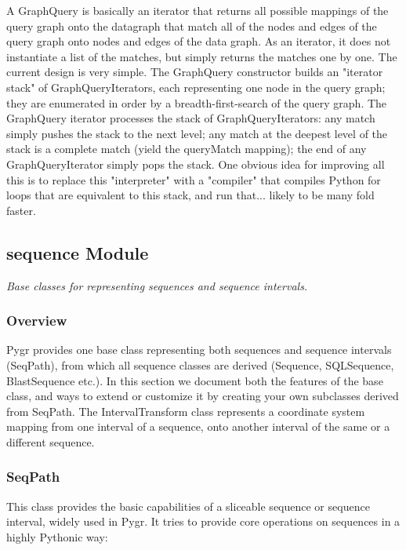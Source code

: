 \documentclass{howto}
\begin{document}
A GraphQuery is basically an iterator that returns all possible mappings of the query graph onto the datagraph that match all of the nodes and edges of the query graph onto nodes and edges of the data graph.  As an iterator, it does not instantiate a list of the matches, but simply returns the matches one by one.  The current design is very simple.  The GraphQuery constructor builds an "iterator stack" of GraphQueryIterators, each representing one node in the query graph; they are enumerated in order by a breadth-first-search of the query graph.  The GraphQuery iterator processes the stack of GraphQueryIterators: any match simply pushes the stack to the next level; any match at the deepest level of the stack is a complete match (yield the queryMatch mapping); the end of any GraphQueryIterator simply pops the stack.  One obvious idea for improving all this is to replace this "interpreter" with a "compiler" that compiles Python for loops that are equivalent to this stack, and run that... likely to be many fold faster.





\subsection{sequence Module}
\label{sequence}

{\em Base classes for representing sequences and sequence intervals.}


\subsubsection{Overview}
Pygr provides one base class representing both sequences and sequence intervals (SeqPath),
from which all sequence classes are derived (Sequence, SQLSequence, BlastSequence etc.).
In this section we document both the features of the base class, and ways to extend or
customize it by creating your own subclasses derived from SeqPath.  The IntervalTransform
class represents a coordinate system mapping from one interval of a sequence, onto 
another interval of the same or a different sequence.

\subsubsection{SeqPath}
This class provides the basic capabilities of a sliceable sequence or sequence interval,
widely used in Pygr.  It tries to provide core operations on sequences in a highly
Pythonic way:
\end{document}
